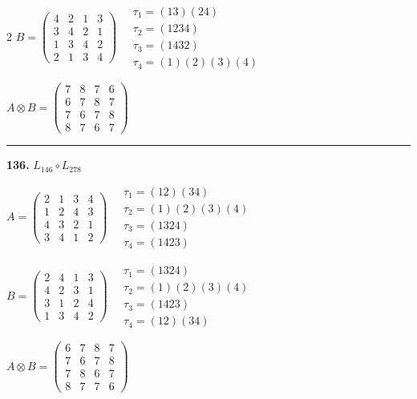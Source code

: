 \begin{multicols}{2}
$B = \begin{pmatrix} 4 & 2 & 1 & 3 \\ 3 & 4 & 2 & 1 \\ 1 & 3 & 4 & 2 \\ 2 & 1 & 3 & 4 \end{pmatrix} \quad \begin{matrix} \tau_{1}=(1 3)(2 4) \\ \tau_{2}=(1 2 3 4) \\ \tau_{3}=(1 4 3 2) \\ \tau_{4}=(1)(2)(3)(4) \end{matrix}$

$A \otimes B = \begin{pmatrix} 7 & 8 & 7 & 6 \\ 6 & 7 & 8 & 7 \\ 7 & 6 & 7 & 8 \\ 8 & 7 & 6 & 7 \end{pmatrix}$

\vspace{0.3em}
\hrule
\vspace{0.3em}

\noindent\textbf{136.} $L_{146} \circ L_{278}$

$A = \begin{pmatrix} 2 & 1 & 3 & 4 \\ 1 & 2 & 4 & 3 \\ 4 & 3 & 2 & 1 \\ 3 & 4 & 1 & 2 \end{pmatrix} \quad \begin{matrix} \tau_{1}=(1 2)(3 4) \\ \tau_{2}=(1)(2)(3)(4) \\ \tau_{3}=(1 3 2 4) \\ \tau_{4}=(1 4 2 3) \end{matrix}$

$B = \begin{pmatrix} 2 & 4 & 1 & 3 \\ 4 & 2 & 3 & 1 \\ 3 & 1 & 2 & 4 \\ 1 & 3 & 4 & 2 \end{pmatrix} \quad \begin{matrix} \tau_{1}=(1 3 2 4) \\ \tau_{2}=(1)(2)(3)(4) \\ \tau_{3}=(1 4 2 3) \\ \tau_{4}=(1 2)(3 4) \end{matrix}$

$A \otimes B = \begin{pmatrix} 6 & 7 & 8 & 7 \\ 7 & 6 & 7 & 8 \\ 7 & 8 & 6 & 7 \\ 8 & 7 & 7 & 6 \end{pmatrix}$


\end{multicols}
